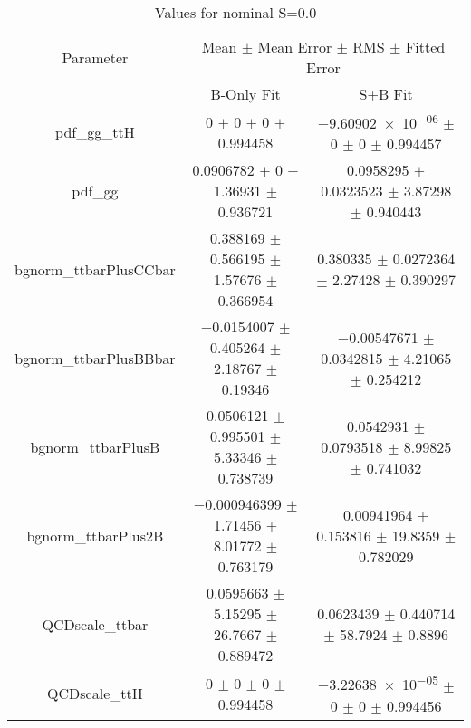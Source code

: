 \begin{table}
\centering
\caption{Values for nominal S=0.0}
\begin{tabular}{ccc}
\toprule
Parameter & \multicolumn{2}{c}{Mean $\pm$ Mean Error $\pm$ RMS $\pm$ Fitted Error}\\
 & B-Only Fit & S+B Fit\\
\midrule
pdf\_gg\_ttH & \num{0} $\pm$ \num{0} $\pm$ \num{0} $\pm$ \num{0.994458} & \num{-9.60902e-06} $\pm$ \num{0} $\pm$ \num{0} $\pm$ \num{0.994457}\\
pdf\_gg & \num{0.0906782} $\pm$ \num{0} $\pm$ \num{1.36931} $\pm$ \num{0.936721} & \num{0.0958295} $\pm$ \num{0.0323523} $\pm$ \num{3.87298} $\pm$ \num{0.940443}\\
bgnorm\_ttbarPlusCCbar & \num{0.388169} $\pm$ \num{0.566195} $\pm$ \num{1.57676} $\pm$ \num{0.366954} & \num{0.380335} $\pm$ \num{0.0272364} $\pm$ \num{2.27428} $\pm$ \num{0.390297}\\
bgnorm\_ttbarPlusBBbar & \num{-0.0154007} $\pm$ \num{0.405264} $\pm$ \num{2.18767} $\pm$ \num{0.19346} & \num{-0.00547671} $\pm$ \num{0.0342815} $\pm$ \num{4.21065} $\pm$ \num{0.254212}\\
bgnorm\_ttbarPlusB & \num{0.0506121} $\pm$ \num{0.995501} $\pm$ \num{5.33346} $\pm$ \num{0.738739} & \num{0.0542931} $\pm$ \num{0.0793518} $\pm$ \num{8.99825} $\pm$ \num{0.741032}\\
bgnorm\_ttbarPlus2B & \num{-0.000946399} $\pm$ \num{1.71456} $\pm$ \num{8.01772} $\pm$ \num{0.763179} & \num{0.00941964} $\pm$ \num{0.153816} $\pm$ \num{19.8359} $\pm$ \num{0.782029}\\
QCDscale\_ttbar & \num{0.0595663} $\pm$ \num{5.15295} $\pm$ \num{26.7667} $\pm$ \num{0.889472} & \num{0.0623439} $\pm$ \num{0.440714} $\pm$ \num{58.7924} $\pm$ \num{0.8896}\\
QCDscale\_ttH & \num{0} $\pm$ \num{0} $\pm$ \num{0} $\pm$ \num{0.994458} & \num{-3.22638e-05} $\pm$ \num{0} $\pm$ \num{0} $\pm$ \num{0.994456}\\
\bottomrule
\end{tabular}
\end{table}